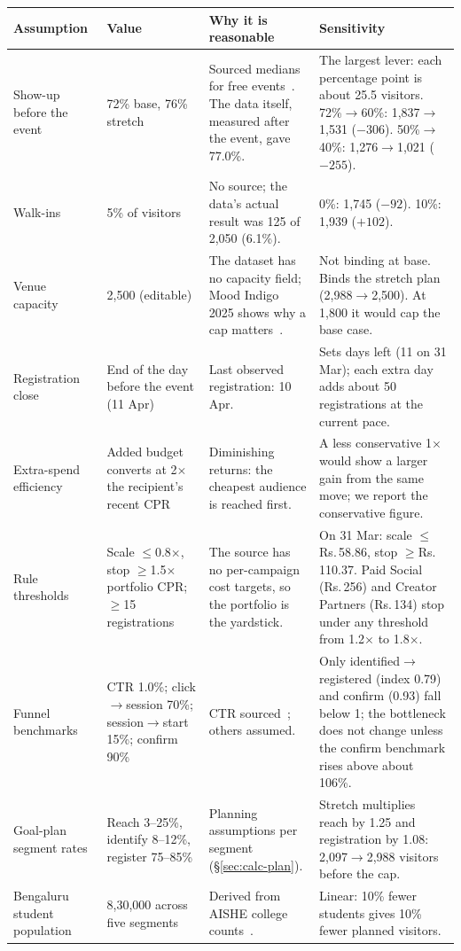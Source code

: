 \documentclass[11pt,a4paper]{article}
\newcommand{\rs}{Rs.\,}
\begin{document}
\begin{longtable}{@{}p{3.1cm}p{2.3cm}p{4.9cm}p{4.9cm}@{}}
\toprule
\textbf{Assumption} & \textbf{Value} & \textbf{Why it is reasonable} & \textbf{Sensitivity} \\
\midrule
\endhead
Show-up before the event & 72\% base, 76\% stretch & Sourced medians for free events~\cite{pheedloop5}. The data itself, measured after the event, gave 77.0\%. & The largest lever: each percentage point is about 25.5 visitors. 72\%$\to$60\%: 1,837$\to$1,531 ($-306$). 50\%$\to$40\%: 1,276$\to$1,021 ($-255$). \\
Walk-ins & 5\% of visitors & No source; the data's actual result was 125 of 2,050 (6.1\%). & 0\%: 1,745 ($-92$). 10\%: 1,939 ($+102$). \\
Venue capacity & 2,500 (editable) & The dataset has no capacity field; Mood Indigo 2025 shows why a cap matters~\cite{careers360MoodIndigo}. & Not binding at base. Binds the stretch plan (2,988$\to$2,500). At 1,800 it would cap the base case. \\
Registration close & End of the day before the event (11 Apr) & Last observed registration: 10 Apr. & Sets days left (11 on 31 Mar); each extra day adds about 50 registrations at the current pace. \\
Extra-spend efficiency & Added budget converts at 2$\times$ the recipient's recent CPR & Diminishing returns: the cheapest audience is reached first. & A less conservative 1$\times$ would show a larger gain from the same move; we report the conservative figure. \\
Rule thresholds & Scale $\le$0.8$\times$, stop $\ge$1.5$\times$ portfolio CPR; $\ge$15 registrations & The source has no per-campaign cost targets, so the portfolio is the yardstick. & On 31 Mar: scale $\le$\rs58.86, stop $\ge$\rs110.37. Paid Social (\rs256) and Creator Partners (\rs134) stop under any threshold from 1.2$\times$ to 1.8$\times$. \\
Funnel benchmarks & CTR 1.0\%; click$\to$session 70\%; session$\to$start 15\%; confirm 90\% & CTR sourced~\cite{owlclawMeta}; others assumed. & Only identified$\to$registered (index 0.79) and confirm (0.93) fall below 1; the bottleneck does not change unless the confirm benchmark rises above about 106\%. \\
Goal-plan segment rates & Reach 3--25\%, identify 8--12\%, register 75--85\% & Planning assumptions per segment (\S\ref{sec:calc-plan}). & Stretch multiplies reach by 1.25 and registration by 1.08: 2,097$\to$2,988 visitors before the cap. \\
Bengaluru student population & 8,30,000 across five segments & Derived from AISHE college counts~\cite{aishe2024}. & Linear: 10\% fewer students gives 10\% fewer planned visitors. \\
\bottomrule
\end{longtable}
\end{document}
